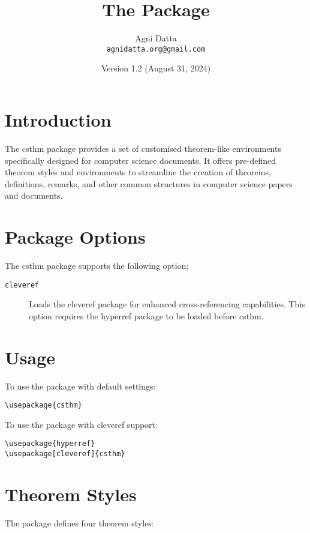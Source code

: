\documentclass{ltxdoc}
\title{The \pkg{csthm} Package}
\author{Agni Datta \\ \texttt{agnidatta.org@gmail.com}}
\date{Version 1.2 (August 31, 2024)}
\newcommand{\pkg}[1]{\textsf{#1}}
\newcommand{\opt}[1]{\texttt{#1}}
\begin{document}
\maketitle

\tableofcontents

\section{Introduction}

The \pkg{csthm} package provides a set of customised theorem-like environments specifically designed for computer science documents. It offers pre-defined theorem styles and environments to streamline the creation of theorems, definitions, remarks, and other common structures in computer science papers and documents.

\section{Package Options}

The \pkg{csthm} package supports the following option:

\begin{description}
	\item[\opt{cleveref}] Loads the \pkg{cleveref} package for enhanced cross-referencing capabilities. This option requires the \pkg{hyperref} package to be loaded before \pkg{csthm}.
\end{description}

\section{Usage}

To use the package with default settings:

\begin{verbatim}
\usepackage{csthm}
\end{verbatim}

To use the package with \pkg{cleveref} support:

\begin{verbatim}
\usepackage{hyperref}
\usepackage[cleveref]{csthm}
\end{verbatim}

\section{Theorem Styles}

The package defines four theorem styles:
\end{document}
